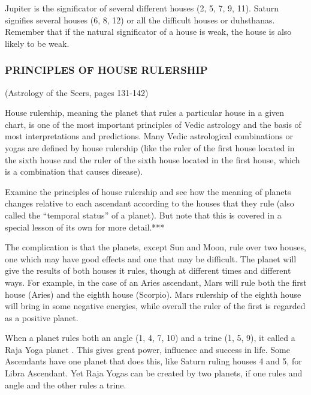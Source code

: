 Jupiter is the significator of several different houses (2, 5, 7, 9, 11). Saturn signifies several houses (6, 8, 12) or all the difficult houses or duhsthanas. Remember that if the natural significator of a house is weak, the house is also likely to be weak.

 

\subsubsection{PRINCIPLES OF HOUSE RULERSHIP} (Astrology of the Seers, pages 131-142)

 

House rulership, meaning the planet that rules a particular house in a given chart, is one of the most important principles of Vedic astrology and the basis of most interpretations and predictions. Many Vedic astrological combinations or yogas are defined by house rulership (like the ruler of the first house located in the sixth house and the ruler of the sixth house located in the first house, which is a combination that causes disease).

 

Examine the principles of house rulership and see how the meaning of planets changes relative to each ascendant according to the houses that they rule (also called the “temporal status” of a planet). But note that this is covered in a special lesson of its own for more detail.***

 

The complication is that the planets, except Sun and Moon, rule over two houses, one which may have good effects and one that may be difficult. The planet will give the results of both houses it rules, though at different times and different ways. For example, in the case of an Aries ascendant, Mars will rule both the first house (Aries) and the eighth house (Scorpio). Mars rulership of the eighth house will bring in some negative energies, while overall the ruler of the first is regarded as a positive planet.

 

When a planet rules both an angle (1, 4, 7, 10) and a trine (1, 5, 9), it  called a Raja Yoga planet . This gives great power, influence and success in life. Some Ascendants have one planet that does this, like Saturn ruling houses 4 and 5, for Libra Ascendant. Yet Raja Yogas can be created by two planets, if one rules and angle and the other rules a trine.

 

